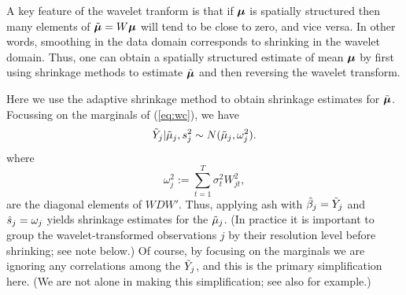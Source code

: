 \documentclass[12pt]{article}
\newcommand{\s}{\sigma}
\begin{document}
A key feature of the wavelet tranform is that if $\bm{\mu}$ is spatially structured 
then many elements of $\tilde{\bm{\mu}}=W\bm{\mu}$ will tend to be close to zero, and vice versa.
In other words, smoothing in the data domain corresponds to shrinking in the wavelet domain.
Thus, one can obtain a spatially structured estimate of
mean $\bm{\mu}$ by first using shrinkage methods to estimate $\tilde{\bm{\mu}}$ and then
reversing the wavelet transform. 


Here we use the adaptive shrinkage method to obtain shrinkage estimates for $\tilde{\bm{\mu}}$.
Focussing on the marginals of (\ref{eq:wc}), we have
\begin{equation} \label{eq:normlik}
\tilde{Y}_j | \tilde\mu_j, s^2_j \sim N(\tilde\mu_j, \omega^2_j).
\end{equation}
where
\begin{equation}
\omega^2_j:=\sum_{t=1}^T \s^2_t W_{jt}^2,
\end{equation}
are the diagonal elements of $WDW'$.
Thus, applying ash with $\hat{\beta}_j = \tilde{Y}_j$ and $\hat{s}_j = \omega_j$ yields shrinkage estimates for the $\tilde\mu_j$.
(In practice it is important to group the wavelet-transformed observations $j$ 
by their resolution level before shrinking; see note below.)
Of course, by focusing on the marginals we are ignoring any correlations among the $\tilde{Y}_j$, and this
is the primary simplification here. (We are not alone in making this simplification;
see also \cite{Silverman1999Wavelets} for example.) 
\end{document}
